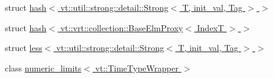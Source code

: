 \begin{DoxyCompactItemize}
struct \hyperlink{structstd_1_1hash_3_01vt_1_1util_1_1strong_1_1detail_1_1_strong_3_01_t_00_01init__val_00_01_tag_01_4_01_4}{hash$<$ vt\+::util\+::strong\+::detail\+::\+Strong$<$ T, init\+\_\+val, Tag $>$ $>$}
\item 
struct \hyperlink{structstd_1_1hash_3_01vt_1_1vrt_1_1collection_1_1_base_elm_proxy_3_01_index_t_01_4_01_4}{hash$<$ vt\+::vrt\+::collection\+::\+Base\+Elm\+Proxy$<$ Index\+T $>$ $>$}
\item 
struct \hyperlink{structstd_1_1less_3_01vt_1_1util_1_1strong_1_1detail_1_1_strong_3_01_t_00_01init__val_00_01_tag_01_4_01_4}{less$<$ vt\+::util\+::strong\+::detail\+::\+Strong$<$ T, init\+\_\+val, Tag $>$ $>$}
\item 
class \hyperlink{classstd_1_1numeric__limits_3_01vt_1_1_time_type_wrapper_01_4}{numeric\+\_\+limits$<$ vt\+::\+Time\+Type\+Wrapper $>$}
\end{DoxyCompactItemize}
